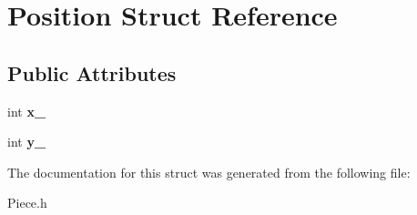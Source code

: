\hypertarget{struct_position}{}\section{Position Struct Reference}
\label{struct_position}
\subsection*{Public Attributes}
\begin{DoxyCompactItemize}
\item 
\mbox{\label{struct_position_a5eee55bf1718fb7c4f296930c38087fe}} 
int {\bfseries x\+\_\+}
\item 
\mbox{\label{struct_position_ac18ebbc60c7d67bb6b30fc1ef82948af}} 
int {\bfseries y\+\_\+}
\end{DoxyCompactItemize}


The documentation for this struct was generated from the following file\+:\begin{DoxyCompactItemize}
\item 
Piece.\+h\end{DoxyCompactItemize}
